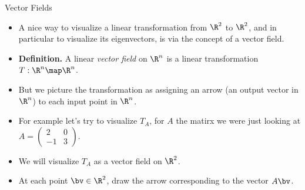\documentclass{beamer}
\begin{document}

\begin{frame}{Vector Fields}

\begin{itemize}
\item A nice way to visualize a linear transformation from $\R^2$ to $\R^2$,
and in particular to visualize its eigenvectors, is via the concept of
a vector field.
\item \textbf{Definition.} A linear \emph{vector field} on $\R^n$ is a linear transformation
$T:\R^n\map\R^n$.
\item But we picture the transformation as assigning an arrow (an output vector in $\R^n$)
to each input point in $\R^n$.
\item For example let's try to visualize $T_A$, for $A$ the matirx
we were just looking at
$A=
\begin{pmatrix}
2 & 0 \\
-1 & 3
\end{pmatrix}.
$
\item We will visualize $T_A$ as a vector field on $\R^2$.
\item At each point $\bv\in\R^2$, draw the arrow corresponding to the vector $A\bv$.
\end{itemize}
\end{frame}

\end{document}
